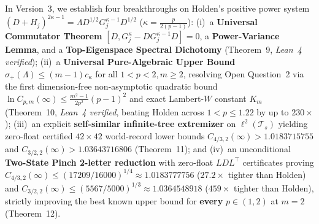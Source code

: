 \documentclass[10pt,letterpaper]{article}
\begin{document}
\begin{tcolorbox}[abstractbox]
{In Version~3, we establish four breakthroughs on Holden's positive power system $(D + H_j)^{2\kappa-1} = \Lambda D^{1/2} G_j^{\kappa-1} D^{1/2}$ ($\kappa = \frac{p}{2(p-1)}$): (i)~a \textbf{Universal Commutator Theorem} $[D, G_j^\kappa - D G_j^{\kappa-1} D] = 0$, a \textbf{Power-Variance Lemma}, and a \textbf{Top-Eigenspace Spectral Dichotomy} (Theorem~9, \emph{Lean~4 verified}); (ii)~a \textbf{Universal Pure-Algebraic Upper Bound} $\sigma_+(\Lambda) \le (m-1)c_\kappa$ for all $1<p<2, m\ge 2$, resolving Open Question~2 via the first dimension-free non-asymptotic quadratic bound $\ln C_{p,m}(\infty) \le \frac{m^2-1}{2p^2}(p-1)^2$ and exact Lambert-$W$ constant $K_m$ (Theorem~10, \emph{Lean~4 verified}, beating Holden across $1 < p \le 1.22$ by up to $230\times$); (iii)~an explicit \textbf{self-similar infinite-tree extremizer} on $\ell^2(\mathcal{T}_s)$ yielding zero-float certified $42\times 42$ world-record lower bounds $C_{4/3,2}(\infty) > 1.0183715755$ and $C_{3/2,2}(\infty) > 1.03643716806$ (Theorem~11); and (iv)~an unconditional \textbf{Two-State Pinch 2-letter reduction} with zero-float $LDL^\top$ certificates proving $C_{4/3,2}(\infty) \le (17209/16000)^{1/4} \approx 1.0183777756$ ($27.2\times$ tighter than Holden) and $C_{3/2,2}(\infty) \le (5567/5000)^{1/3} \approx 1.0364548918$ ($459\times$ tighter than Holden), strictly improving the best known upper bound for \textbf{every} $p \in (1, 2)$ at $m = 2$ (Theorem~12).}
\end{tcolorbox}
\end{document}
